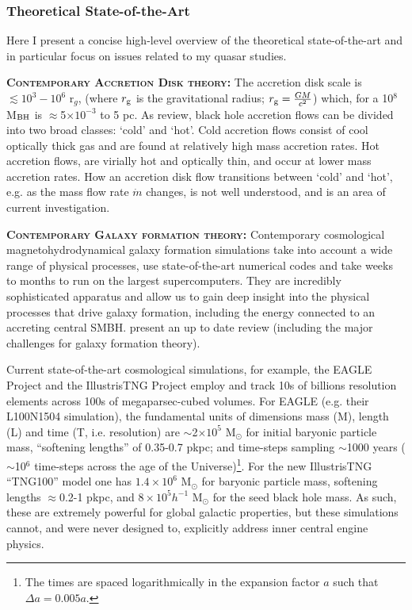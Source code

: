\subsubsection{Theoretical State-of-the-Art}
Here I present a concise high-level overview of the theoretical
state-of-the-art and in particular focus on issues related to my 
quasar studies.

\smallskip 
\smallskip
\noindent 
\textbf{\textsc{Contemporary Accretion Disk theory:}} 
The accretion disk scale is $\lesssim 10^{3}-10^{6}$ r$_{g}$, (where
$r_{\rm g}$ is the gravitational radius; $r_{\rm g}=\frac{GM}{c^2}$)
which, for a 10$^{8}$ M$_{\rm BH}$ is $\approx$5$\times$$10^{-3}$ to 5
pc.  As \citet{YuanNarayan2014} review, black hole accretion flows can
be divided into two broad classes: `cold' and `hot'. Cold accretion
flows consist of cool optically thick gas and are found at relatively
high mass accretion rates.  Hot accretion flows, are virially hot and
optically thin, and occur at lower mass accretion rates.  How an
accretion disk flow transitions between `cold' and `hot', e.g. as the
mass flow rate $\dot{m}$ changes, is not well understood, and is an
area of current investigation.


\smallskip 
\smallskip
\noindent 
\textbf{\textsc{Contemporary Galaxy formation theory:}}
Contemporary cosmological magnetohydrodynamical galaxy formation
simulations take into account a wide range of physical processes, use
state-of-the-art numerical codes and take weeks to months to run on
the largest supercomputers.  They are incredibly sophisticated
apparatus and allow us to gain deep insight into the physical
processes that drive galaxy formation, including the energy connected
to an accreting central SMBH. \citet{NaabOstriker2017} present an up
to date review (including the major challenges for galaxy formation
theory).

\smallskip 
\smallskip
\noindent 
Current state-of-the-art cosmological simulations, for example, the
EAGLE Project \citep{Schaye2015, Crain2015} and the IllustrisTNG
Project \citep{Pillepich2018} employ and track 10s of billions
resolution elements across 100s of megaparsec-cubed volumes.  For
EAGLE (e.g. their L100N1504 simulation), the fundamental units of
dimensions mass (M), length (L) and time (T, i.e. resolution) are
$\sim$2$\times10^{5}$ M$_{\odot}$ for initial baryonic particle mass,
``softening lengths'' of 0.35-0.7 pkpc; and time-steps sampling
$\sim$1000 years ($\sim$10$^{6}$ time-steps across the age of the
Universe)\footnote{The times are spaced logarithmically in the
expansion factor $a$ such that $\Delta a = 0.005a$.}. For the new
IllustrisTNG ``TNG100'' model one has $1.4\times10^{6}$ M$_{\odot}$
for baryonic particle mass, softening lengths $\approx$0.2-1 pkpc, and
$8\times10^{5} h^{-1}$ M$_{\odot}$ for the seed black hole mass.  As
such, these are extremely powerful for global galactic properties, but
these simulations cannot, and were never designed to, explicitly
address inner central engine physics.

